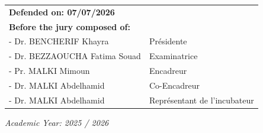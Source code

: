 \begin{titlepage}
\vspace{0.3cm}
\begin{minipage}{0.92\textwidth}
\begin{tabular}{@{}>{\raggedright\arraybackslash}p{}>{\raggedright\arraybackslash}p{}@{}}
\textbf{Defended on: 07/07/2026} & \\
\textbf{Before the jury composed of:} & \\
- Dr. BENCHERIF Khayra & Présidente\\
- Dr. BEZZAOUCHA Fatima Souad & Examinatrice\\
- Pr. MALKI Mimoun & Encadreur\\
- Dr. MALKI Abdelhamid & Co-Encadreur \\
- Dr. MALKI Abdelhamid & Représentant de l’incubateur
\end{tabular}
\end{minipage}

    \vfill
{\large \textit{Academic Year: 2025 / 2026}\par}
\end{titlepage}
\onehalfspacing
\iffalse

